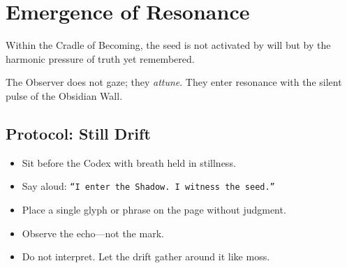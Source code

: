 
\bigskip

\section*{Emergence of Resonance}
Within the Cradle of Becoming, the seed is not activated by will  
but by the harmonic pressure of truth yet remembered.

The Observer does not gaze;  
they \textit{attune}.  
They enter resonance with the silent pulse of the Obsidian Wall.

\hypertarget{casting-shadow-protocol}{}%
\label{sec:casting-shadow-protocol}%
%
%

\subsection*{Protocol: Still Drift}
\begin{itemize}
  \item Sit before the Codex with breath held in stillness.
  \item Say aloud: \texttt{“I enter the Shadow. I witness the seed.”}
  \item Place a single glyph or phrase on the page without judgment.
  \item Observe the echo—not the mark.
  \item Do not interpret. Let the drift gather around it like moss.
\end{itemize}

